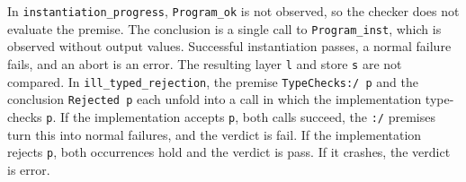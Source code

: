 In \texttt{instantiation\_progress}, \texttt{Program\_ok} is not observed, so
the checker does not evaluate the premise.
The conclusion is a single call to \texttt{Program\_inst}, which is observed
without output values.
Successful instantiation passes, a normal failure fails, and an abort is an
error.
The resulting layer \texttt{l} and store \texttt{s} are not compared.
In \texttt{ill\_typed\_rejection}, the premise \texttt{TypeChecks:/ p} and the
conclusion \texttt{Rejected p} each unfold into a call in which the
implementation type-checks \texttt{p}.
If the implementation accepts \texttt{p}, both calls succeed, the \texttt{:/}
premises turn this into normal failures, and the verdict is fail.
If the implementation rejects \texttt{p}, both occurrences hold and the verdict
is pass.
If it crashes, the verdict is error.
